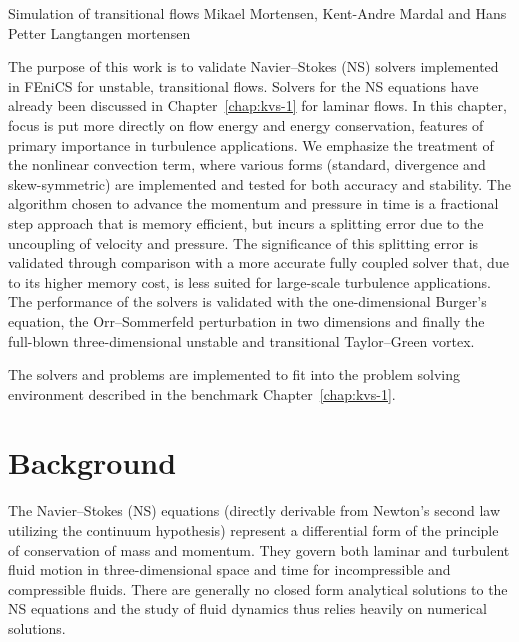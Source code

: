 \renewcommand{\vec}[1]{\ensuremath{{#1}}}
\newcommand{\Nset}{\ensuremath{\mathbb{N}}\xspace}
\newcommand{\Zset}{\ensuremath{\mathbb{Z}}\xspace}
\newcommand{\Qset}{\ensuremath{\mathbb{Q}}\xspace}
\newcommand{\Cset}{\ensuremath{\mathbb{C}}\xspace}
\newcommand{\Hdivnull}{\ensuremath{Z}}

              {Simulation of transitional flows}
              {Mikael Mortensen, Kent-Andre Mardal and Hans Petter Langtangen}
              {mortensen}


The purpose of this work is to validate Navier--Stokes (NS) solvers
implemented in FEniCS for unstable, transitional flows. Solvers for the
NS equations have already been discussed in Chapter~\ref{chap:kvs-1} for
laminar flows. In this chapter, focus is put more directly on flow energy
and energy conservation, features of primary importance in turbulence
applications. We emphasize the treatment of the nonlinear convection
term, where various forms (standard, divergence and skew-symmetric) are
implemented and tested for both accuracy and stability. The algorithm
chosen to advance the momentum and pressure in time is a fractional step
approach that is memory efficient, but incurs a splitting error due to the
uncoupling of velocity and pressure. The significance of this splitting
error is validated through comparison with a more accurate fully coupled
solver that, due to its higher memory cost, is less suited for large-scale
turbulence applications. The performance of the solvers is validated with
the one-dimensional Burger's equation, the Orr--Sommerfeld perturbation
in two dimensions and finally the full-blown three-dimensional unstable
and transitional Taylor--Green vortex.

The solvers and problems are implemented to fit into the problem solving
environment described in the benchmark Chapter~\ref{chap:kvs-1}.

\section{Background}

The Navier--Stokes (NS) equations (directly derivable from Newton's
second law utilizing the continuum hypothesis) represent a differential
form of the principle of conservation of mass and momentum. They govern
both laminar and turbulent fluid motion in three-dimensional space and
time for incompressible and compressible fluids. There are generally no
closed form analytical solutions to the NS equations and the study of
fluid dynamics thus relies heavily on numerical solutions.

